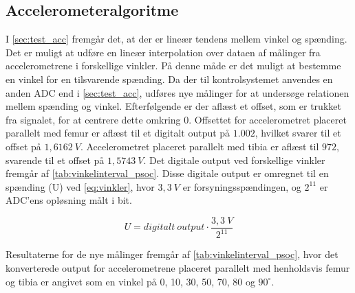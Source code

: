 \subsection{Accelerometeralgoritme}\label{sec:imp_vinkler}
I \autoref{sec:test_acc} fremgår det, at der er lineær tendens mellem vinkel og spænding. Det er muligt at udføre en lineær interpolation over dataen af målinger fra accelerometrene i forskellige vinkler. På denne måde er det muligt at bestemme en vinkel for en tilsvarende spænding. 
Da der til kontrolsystemet anvendes en anden ADC end i \autoref{sec:test_acc}, udføres nye målinger for at undersøge relationen mellem spænding og vinkel.  
Efterfølgende er der aflæst et offset, som er trukket fra signalet, for at centrere dette omkring 0. Offsettet for accelerometret placeret parallelt med femur er aflæst til et digitalt output på $1.002$, hvilket svarer til et offset på $1,6162~V$. Accelerometret placeret parallelt med tibia er aflæst til $972$, svarende til et offset på $1,5743~V$. Det digitale output ved forskellige vinkler fremgår af \autoref{tab:vinkelinterval_psoc}. Disse digitale output er omregnet til en spænding (U) ved \autoref{eq:vinkler}, hvor $3,3~V$ er forsyningsspændingen, og $2^{11}$ er ADC'ens opløsning målt i bit.  

\begin{equation}
\label{eq:vinkler}
U = digitalt~output\cdot \dfrac{3,3~V}{2^{11}}
\end{equation}

\noindent
Resultaterne for de nye målinger fremgår af \autoref{tab:vinkelinterval_psoc}, hvor det konverterede output for accelerometrene placeret parallelt med henholdsvis femur og tibia er angivet som en vinkel på 0, 10, 30, 50, 70, 80 og $90^{\circ}$. 

